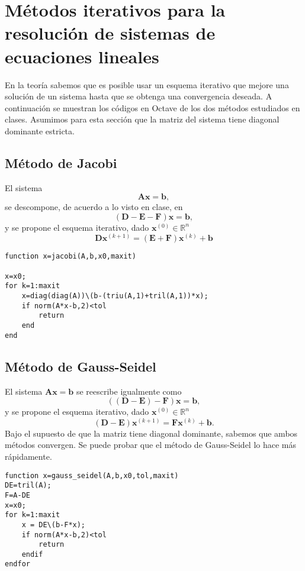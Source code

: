 \documentclass[letter,11pt]{article}
\newcommand{\octave}{{\sc Octave} }
\begin{document}
\section{M\'etodos iterativos para la resoluci\'on de sistemas de ecuaciones lineales}                                                         
En la teor\'ia sabemos que es posible usar un esquema iterativo que mejore una soluci\'on de un sistema hasta que se obtenga una convergencia deseada. A continuaci\'on se muestran los c\'odigos en \octave de los dos m\'etodos estudiados en clases. Asumimos para esta secci\'on que la matriz del sistema tiene diagonal dominante estricta.

\subsection{M\'etodo de Jacobi}

El sistema
$$
\mathbf{A}\boldsymbol{x}=\boldsymbol{b},
$$
se descompone, de acuerdo a lo visto en clase, en 
$$
(\mathbf{D}-\mathbf{E}-\mathbf{F})\boldsymbol{x}=\boldsymbol{b},
$$
y se propone el esquema iterativo, dado $\boldsymbol{x}^{(0)}\in\mathbb{R}^n$
$$
\mathbf{D}\boldsymbol{x}^{(k+1)}=(\mathbf{E}+\mathbf{F})\boldsymbol{x}^{(k)}+\boldsymbol{b}
$$
\begin{verbatim}
function x=jacobi(A,b,x0,maxit)

x=x0;
for k=1:maxit
    x=diag(diag(A))\(b-(triu(A,1)+tril(A,1))*x);
    if norm(A*x-b,2)<tol
        return
    end
end
\end{verbatim}

\subsection{M\'etodo de Gauss-Seidel}

El sistema $\mathbf{A}\boldsymbol{x}=\boldsymbol{b}$ se reescribe igualmente como
$$
((\mathbf{D}-\mathbf{E})-\mathbf{F})\boldsymbol{x}=\boldsymbol{b},
$$
y se propone el esquema iterativo, dado $\boldsymbol{x}^{(0)}\in\mathbb{R}^n$
$$
(\mathbf{D}-\mathbf{E})\boldsymbol{x}^{(k+1)}=\mathbf{F}\boldsymbol{x}^{(k)}+\boldsymbol{b}.
$$
Bajo el supuesto de que la matriz tiene diagonal dominante, sabemos que ambos m\'etodos convergen. Se puede probar que el m\'etodo de Gauss-Seidel lo hace m\'as r\'apidamente.
\begin{verbatim}
function x=gauss_seidel(A,b,x0,tol,maxit)
DE=tril(A);
F=A-DE
x=x0;
for k=1:maxit
    x = DE\(b-F*x);
    if norm(A*x-b,2)<tol
        return
    endif
endfor
\end{verbatim}
\end{document}
